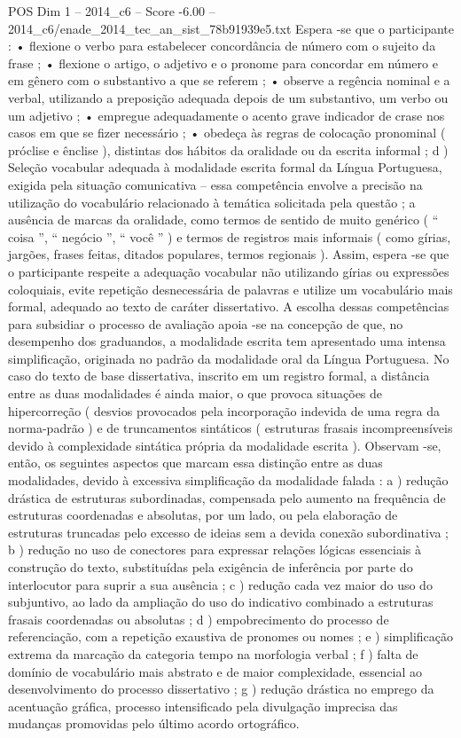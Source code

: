 \begin{textsample}{POS Dim 1 – 2014\_c6 – Score -6.00 – 2014\_c6/enade\_2014\_tec\_an\_sist\_78b91939e5.txt}
Espera -se que o participante : • flexione o verbo para estabelecer concordância de número com o sujeito da frase ; • flexione o artigo, o adjetivo e o pronome para concordar em número e em gênero com o substantivo a que se referem ; • observe a regência nominal e a verbal, utilizando a preposição adequada depois de um substantivo, um verbo ou um adjetivo ; • empregue adequadamente o acento grave indicador de crase nos casos em que se fizer necessário ; • obedeça às regras de colocação pronominal ( próclise e ênclise ), distintas dos hábitos da oralidade ou da escrita informal ; d ) Seleção vocabular adequada à modalidade escrita formal da Língua Portuguesa, exigida pela situação comunicativa – essa competência envolve a precisão na utilização do vocabulário relacionado à temática solicitada pela questão ; a ausência de marcas da oralidade, como termos de sentido de muito genérico ( “ coisa ”, “ negócio ”, “ você ” ) e termos de registros mais informais ( como gírias, jargões, frases feitas, ditados populares, termos regionais ).
Assim, espera -se que o participante respeite a adequação vocabular não utilizando gírias ou expressões coloquiais, evite repetição desnecessária de palavras e utilize um vocabulário mais formal, adequado ao texto de caráter dissertativo.
A escolha dessas competências para subsidiar o processo de avaliação apoia -se na concepção de que, no desempenho dos graduandos, a modalidade escrita tem apresentado uma intensa simplificação, originada no padrão da modalidade oral da Língua Portuguesa.
No caso do texto de base dissertativa, inscrito em um registro formal, a distância entre as duas modalidades é ainda maior, o que provoca situações de hipercorreção ( desvios provocados pela incorporação indevida de uma regra da norma-padrão ) e de truncamentos sintáticos ( estruturas frasais incompreensíveis devido à complexidade sintática própria da modalidade escrita ).
Observam -se, então, os seguintes aspectos que marcam essa distinção entre as duas modalidades, devido à excessiva simplificação da modalidade falada : a ) redução drástica de estruturas subordinadas, compensada pelo aumento na frequência de estruturas coordenadas e absolutas, por um lado, ou pela elaboração de estruturas truncadas pelo excesso de ideias sem a devida conexão subordinativa ; b ) redução no uso de conectores para expressar relações lógicas essenciais à construção do texto, substituídas pela exigência de inferência por parte do interlocutor para suprir a sua ausência ; c ) redução cada vez maior do uso do subjuntivo, ao lado da ampliação do uso do indicativo combinado a estruturas frasais coordenadas ou absolutas ; d ) empobrecimento do processo de referenciação, com a repetição exaustiva de pronomes ou nomes ; e ) simplificação extrema da marcação da categoria tempo na morfologia verbal ; f ) falta de domínio de vocabulário mais abstrato e de maior complexidade, essencial ao desenvolvimento do processo dissertativo ; g ) redução drástica no emprego da acentuação gráfica, processo intensificado pela divulgação imprecisa das mudanças promovidas pelo último acordo ortográfico.

\end{textsample}
